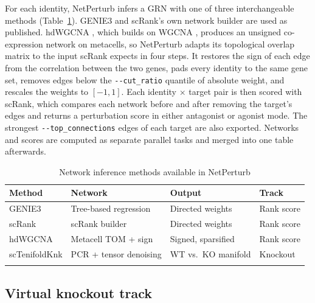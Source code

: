 \documentclass[pdflatex,sn-vancouver-num]{sn-jnl}%
\newcommand{\param}[1]{\texttt{-{}-#1}}
\begin{document}
For each identity, NetPerturb infers a GRN with one of three interchangeable methods (Table~\ref{tab:methods}). GENIE3 \citep{HuynhThu2010genie3} and scRank's own network builder \citep{Li2024scrank} are used as published. hdWGCNA \citep{Morabito2023hdwgcna}, which builds on WGCNA \citep{Langfelder2008wgcna}, produces an unsigned co-expression network on metacells, so NetPerturb adapts its topological overlap matrix to the input scRank expects in four steps. It restores the sign of each edge from the correlation between the two genes, pads every identity to the same gene set, removes edges below the \param{cut\_ratio} quantile of absolute weight, and rescales the weights to $[-1,1]$. Each identity $\times$ target pair is then scored with scRank, which compares each network before and after removing the target's edges and returns a perturbation score in either antagonist or agonist mode. The strongest \param{top\_connections} edges of each target are also exported. Networks and scores are computed as separate parallel tasks and merged into one table afterwards.

\begin{table}[t]
\caption{Network inference methods available in NetPerturb}\label{tab:methods}%
\begin{tabular}{@{}llll@{}}
\toprule
Method & Network & Output & Track \\
\midrule
GENIE3        & Tree-based regression  & Directed weights     & Rank score \\
scRank        & scRank builder         & Directed weights     & Rank score \\
hdWGCNA       & Metacell TOM + sign    & Signed, sparsified   & Rank score \\
scTenifoldKnk & PCR + tensor denoising & WT vs.\ KO manifold  & Knockout \\
\botrule
\end{tabular}
\end{table}

\subsection{Virtual knockout track}
\end{document}

